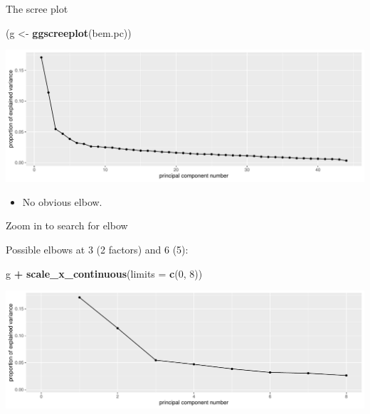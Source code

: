 \documentclass[
  ignorenonframetext,
]{beamer}
\newenvironment{Shaded}{\begin{snugshade}}{\end{snugshade}}
\newcommand{\DataTypeTok}[1]{\textcolor[rgb]{0.13,0.29,0.53}{#1}}
\newcommand{\DecValTok}[1]{\textcolor[rgb]{0.00,0.00,0.81}{#1}}
\newcommand{\KeywordTok}[1]{\textcolor[rgb]{0.13,0.29,0.53}{\textbf{#1}}}
\newcommand{\NormalTok}[1]{#1}
\newcommand{\OperatorTok}[1]{\textcolor[rgb]{0.81,0.36,0.00}{\textbf{#1}}}
\newcommand{\StringTok}[1]{\textcolor[rgb]{0.31,0.60,0.02}{#1}}
\providecommand{\tightlist}{%
  \setlength{\itemsep}{0pt}\setlength{\parskip}{0pt}}
\begin{document}
\begin{frame}[fragile]{The scree plot}
\protect\hypertarget{the-scree-plot}{}

\begin{Shaded}
\begin{Highlighting}[]
\NormalTok{(g <-}\StringTok{ }\KeywordTok{ggscreeplot}\NormalTok{(bem.pc))}
\end{Highlighting}
\end{Shaded}

\includegraphics{slides_d29_files/figure-beamer/genoa-1.pdf}

\begin{itemize}
\tightlist
\item
  No obvious elbow.
\end{itemize}

\end{frame}

\begin{frame}[fragile]{Zoom in to search for elbow}
\protect\hypertarget{zoom-in-to-search-for-elbow}{}

Possible elbows at 3 (2 factors) and 6 (5):

\begin{Shaded}
\begin{Highlighting}[]
\NormalTok{g }\OperatorTok{+}\StringTok{ }\KeywordTok{scale_x_continuous}\NormalTok{(}\DataTypeTok{limits =} \KeywordTok{c}\NormalTok{(}\DecValTok{0}\NormalTok{, }\DecValTok{8}\NormalTok{))}
\end{Highlighting}
\end{Shaded}

\includegraphics{slides_d29_files/figure-beamer/bem-scree-two-1.pdf}

\end{frame}
\end{document}
